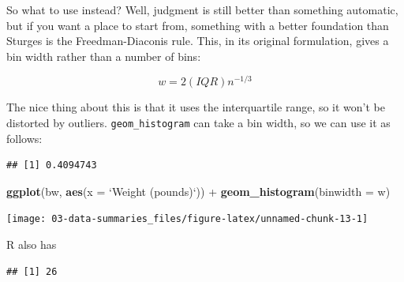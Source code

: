 \documentclass[]{tufte-book}
\newenvironment{Shaded}{}{}
\newcommand{\DataTypeTok}[1]{\textcolor[rgb]{0.56,0.13,0.00}{#1}}
\newcommand{\DecValTok}[1]{\textcolor[rgb]{0.25,0.63,0.44}{#1}}
\newcommand{\KeywordTok}[1]{\textcolor[rgb]{0.00,0.44,0.13}{\textbf{#1}}}
\newcommand{\NormalTok}[1]{#1}
\newcommand{\OperatorTok}[1]{\textcolor[rgb]{0.40,0.40,0.40}{#1}}
\newcommand{\StringTok}[1]{\textcolor[rgb]{0.25,0.44,0.63}{#1}}
\theoremstyle{definition}
\theoremstyle{definition}
\theoremstyle{definition}
\theoremstyle{remark}
\begin{document}
So what to use instead? Well, judgment is still better than something
automatic, but if you want a place to start from, something with a
better foundation than Sturges is the Freedman-Diaconis rule. This, in
its original formulation, gives a bin width rather than a number of
bins:

\[ 
w=2(IQR)n^{-1/3}
\]

The nice thing about this is that it uses the interquartile range, so it
won't be distorted by outliers. \texttt{geom\_histogram} can take a bin
width, so we can use it as follows:

\begin{Shaded}
\end{Shaded}

\begin{verbatim}
## [1] 0.4094743
\end{verbatim}

\begin{Shaded}
\begin{Highlighting}[]
\KeywordTok{ggplot}\NormalTok{(bw, }\KeywordTok{aes}\NormalTok{(}\DataTypeTok{x =} \StringTok{`}\DataTypeTok{Weight (pounds)}\StringTok{`}\NormalTok{)) }\OperatorTok{+}\StringTok{ }\KeywordTok{geom_histogram}\NormalTok{(}\DataTypeTok{binwidth =}\NormalTok{ w)}
\end{Highlighting}
\end{Shaded}

\texttt{[image: 03-data-summaries\_files/figure-latex/unnamed-chunk-13-1]}

R also has

\begin{Shaded}
\end{Shaded}

\begin{verbatim}
## [1] 26
\end{verbatim}
\end{document}

